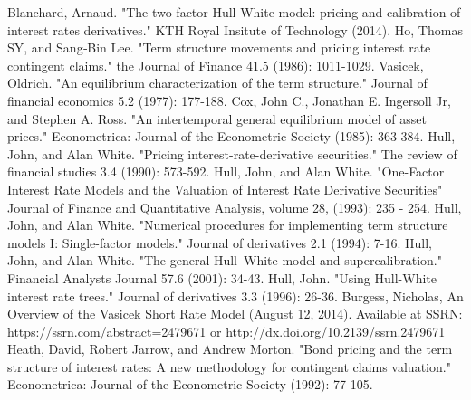 \documentclass{article}
\begin{document}
\begin{thebibliography}{MMMMM} 
 Blanchard, Arnaud. "The two-factor Hull-White model: pricing and calibration of interest rates derivatives." KTH Royal Insitute of Technology (2014).
 Ho, Thomas SY, and Sang‐Bin Lee. "Term structure movements and pricing interest rate contingent claims." the Journal of Finance 41.5 (1986): 1011-1029.
 Vasicek, Oldrich. "An equilibrium characterization of the term structure." Journal of financial economics 5.2 (1977): 177-188.
 Cox, John C., Jonathan E. Ingersoll Jr, and Stephen A. Ross. "An intertemporal general equilibrium model of asset prices." Econometrica: Journal of the Econometric Society (1985): 363-384.
 Hull, John, and Alan White. "Pricing interest-rate-derivative securities." The review of financial studies 3.4 (1990): 573-592.
 Hull, John, and Alan White. "One-Factor Interest Rate Models and the Valuation of Interest Rate Derivative Securities" Journal of Finance and Quantitative Analysis, volume 28,  (1993): 235 - 254.
 Hull, John, and Alan White. "Numerical procedures for implementing term structure models I: Single-factor models." Journal of derivatives 2.1 (1994): 7-16.
 Hull, John, and Alan White. "The general Hull–White model and supercalibration." Financial Analysts Journal 57.6 (2001): 34-43.
 Hull, John. "Using Hull-White interest rate trees." Journal of derivatives 3.3 (1996): 26-36.
 Burgess, Nicholas, An Overview of the Vasicek Short Rate Model (August 12, 2014). Available at SSRN: https://ssrn.com/abstract=2479671 or http://dx.doi.org/10.2139/ssrn.2479671
 Heath, David, Robert Jarrow, and Andrew Morton. "Bond pricing and the term structure of interest rates: A new methodology for contingent claims valuation." Econometrica: Journal of the Econometric Society (1992): 77-105.



\end{thebibliography}


\end{document}
